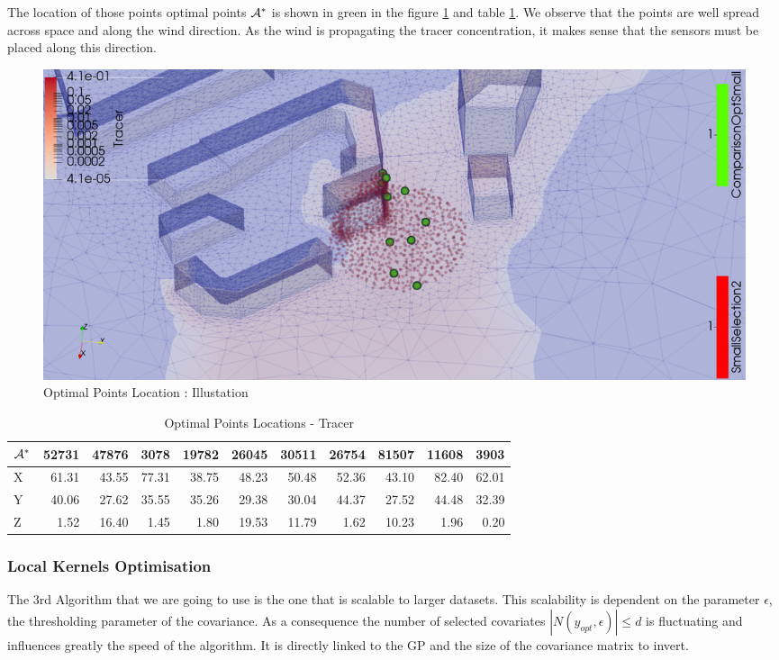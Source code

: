 The location of those points optimal points $\mathcal{A}^*$ is shown in green in the figure \ref{fig:opt_small} and table \ref{tab:opt_small}. We observe that the points are well spread across space and along the wind direction. As the wind is propagating the tracer concentration, it makes sense that the sensors must be placed along this direction. \\

\begin{figure}[h!]
\centering
    \includegraphics[width=0.8\linewidth]{figures/CompAlg/3rd/non_centered_60.35.0/optimal_screenshot}
    \caption{Optimal Points Location : Illustation}
    \label{fig:opt_small}
\end{figure}

\begin{table}[h]
\centering
\footnotesize
\begin{tabular}{l|rrrrrrrrrr}
\toprule
$\mathcal{A}^*$ &  52731 &  47876 &  3078  &  19782 &  26045 &  30511 &  26754 &  81507 &  11608 &  3903  \\
\midrule
X &  61.31 &  43.55 &  77.31 &  38.75 &  48.23 &  50.48 &  52.36 &  43.10 &  82.40 &  62.01 \\
Y &  40.06 &  27.62 &  35.55 &  35.26 &  29.38 &  30.04 &  44.37 &  27.52 &  44.48 &  32.39 \\
Z &   1.52 &  16.40 &   1.45 &   1.80 &  19.53 &  11.79 &   1.62 &  10.23 &   1.96 &   0.20 \\
\bottomrule
\end{tabular}
\caption{Optimal Points Locations - Tracer}
\label{tab:opt_small}
\end{table}

\subsubsection{Local Kernels Optimisation}

The 3rd Algorithm that we are going to use is the one that is scalable to larger datasets. This scalability is dependent on the parameter $\epsilon$, the thresholding parameter of the covariance. As a consequence the number of selected covariates  $|N(y_{opt},\epsilon)| \leq d $ is fluctuating and influences greatly the speed of the algorithm. It is directly linked to the GP and the size of the covariance matrix to invert.  \\ 

